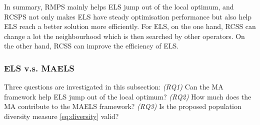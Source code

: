 \documentclass[journal]{IEEEtran}
\newcommand\lwx[1]{\textcolor{magenta}{#1}}
\begin{document}



In summary, RMPS mainly helps ELS jump out of the local optimum, and RCSPS not only makes ELS have steady optimisation performance but also help ELS reach a better solution more efficiently. For ELS, on the one hand, RCSS can change a lot the neighbourhood which is then searched by other operators. On the other hand, RCSS can improve the efficiency of ELS.
 
\subsubsection{ELS v.s. MAELS}\label{sec:els_maels}
Three questions are investigated in this subsection: \emph{(RQ1)} Can the MA framework help ELS jump out of the local optimum? \emph{(RQ2)} How much does the MA contribute to the MAELS framework? \emph{(RQ3)} Is the proposed population diversity measure \eqref{eq:diversity} valid? 
\end{document}
